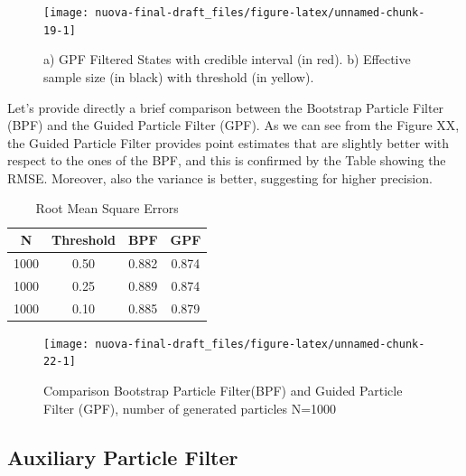 \documentclass[
]{book}
\theoremstyle{break}
\theoremstyle{nonumberplain}
\begin{document}
\begin{figure}[H]

{\centering \texttt{[image: nuova-final-draft\_files/figure-latex/unnamed-chunk-19-1]} 

}

\caption{a) GPF Filtered States with credible interval (in red). b) Effective sample size (in black) with threshold (in yellow).}\label{fig:unnamed-chunk-19}
\end{figure}

Let's provide directly a brief comparison between the Bootstrap Particle
Filter (BPF) and the Guided Particle Filter (GPF). As we can see from
the Figure XX, the Guided Particle Filter provides point estimates that
are slightly better with respect to the ones of the BPF, and this is
confirmed by the Table showing the RMSE. Moreover, also the variance is
better, suggesting for higher precision.

\begin{longtable}[t]{cccc}
\caption{\label{tab:unnamed-chunk-21}Root Mean Square Errors}\\
\toprule
N & Threshold & BPF & GPF\\
\midrule
1000 & 0.50 & 0.882 & 0.874\\
1000 & 0.25 & 0.889 & 0.874\\
1000 & 0.10 & 0.885 & 0.879\\
\bottomrule
\end{longtable}

\begin{figure}[H]

{\centering \texttt{[image: nuova-final-draft\_files/figure-latex/unnamed-chunk-22-1]} 

}

\caption{Comparison Bootstrap Particle Filter(BPF) and Guided Particle Filter (GPF), number of generated particles N=1000}\label{fig:unnamed-chunk-22}
\end{figure}

\subsection{Auxiliary Particle Filter}
\end{document}
